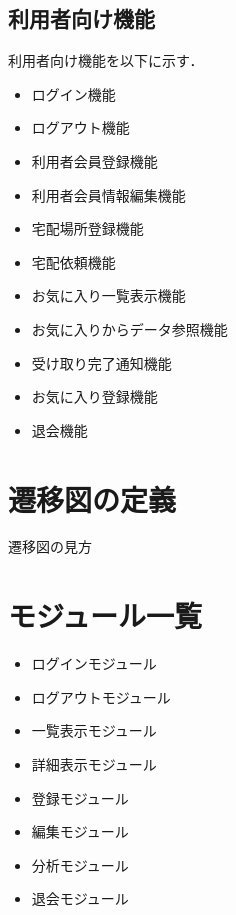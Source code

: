 \documentclass[a4paper, titlepage]{jsarticle}
\begin{document}
\subsection{利用者向け機能}
利用者向け機能を以下に示す．
\begin{itemize}[labelwidth=\linewidth]
  \setlength{\leftskip}{1em}

  \item ログイン機能 %
  \item ログアウト機能 %
  \item 利用者会員登録機能 %
  \item 利用者会員情報編集機能 %
  \item 宅配場所登録機能 %
  \item 宅配依頼機能 %
  \item お気に入り一覧表示機能 %
  \item お気に入りからデータ参照機能 %
  \item 受け取り完了通知機能 %
  \item お気に入り登録機能 %
  \item 退会機能 %
\end{itemize}

\section{遷移図の定義}
遷移図の見方

\section{モジュール一覧}
\begin{itemize}
  \item ログインモジュール
  \item ログアウトモジュール
  \item 一覧表示モジュール
  \item 詳細表示モジュール
  \item 登録モジュール
  \item 編集モジュール
  \item 分析モジュール
  \item 退会モジュール
\end{itemize}
\end{document}

